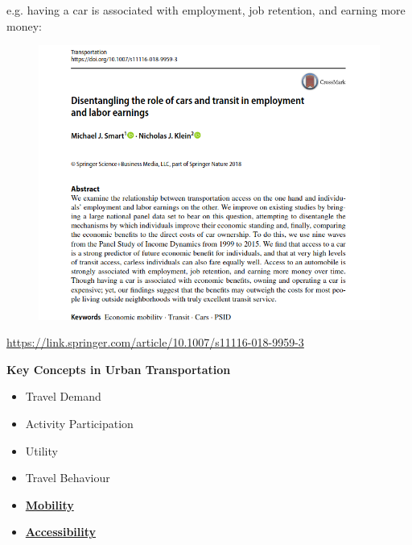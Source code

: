 \documentclass[aspectratio=169]{beamer}
\begin{document}
\begin{frame}
	
	e.g. having a car is associated with employment, job retention, and earning more money:
	
	\begin{figure}
		\centering
		\includegraphics[width=0.6\linewidth]{images/klein_smart_cars.png}
		
	\end{figure}
	
	\tiny{\url{https://link.springer.com/article/10.1007/s11116-018-9959-3}}
	
	
\end{frame}	




\begin{frame}
	\textbf{Key Concepts in Urban Transportation}
	\normalsize
	\vspace{4mm}
	\begin{itemize}
		\item Travel Demand
		\item Activity Participation
		\item Utility
		\item Travel Behaviour
		\item \textbf{\underline{Mobility}}
		\item \textbf{\underline{Accessibility}}
	\end{itemize}
\end{frame}
\end{document}
